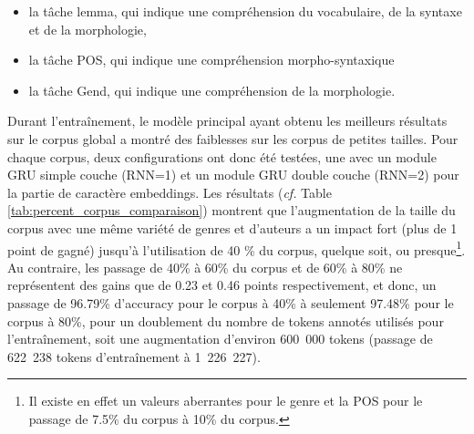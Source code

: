 \begin{itemize}
    \item la tâche lemma, qui indique une compréhension du vocabulaire, de la syntaxe et de la morphologie,
    \item la tâche POS, qui indique une compréhension morpho-syntaxique
    \item la tâche Gend, qui indique une compréhension de la morphologie.
\end{itemize}

Durant l'entraînement, le modèle principal ayant obtenu les meilleurs résultats sur le corpus global a montré des faiblesses sur les corpus de petites tailles. Pour chaque corpus, deux configurations ont donc été testées, une avec un module GRU simple couche (RNN=1) et un module GRU double couche (RNN=2) pour la partie de caractère embeddings. Les résultats (\textit{cf.} Table \ref{tab:percent_corpus_comparaison}) montrent que l'augmentation de la taille du corpus avec une même variété de genres et d'auteurs a un impact fort (plus de 1 point de gagné) jusqu'à l'utilisation de 40 \% du corpus, quelque soit, ou presque\footnote{Il existe en effet un valeurs aberrantes pour le genre et la POS pour le passage de 7.5\% du corpus à 10\% du corpus.}. Au contraire, les passage de 40\% à 60\% du corpus et de 60\% à 80\% ne représentent des gains que de 0.23 et 0.46 points respectivement, et donc, un passage de 96.79\% d'accuracy pour le corpus à 40\% à seulement 97.48\% pour le corpus à 80\%, pour un doublement du nombre de tokens annotés utilisés pour l'entraînement, soit une augmentation d'environ 600~000 tokens (passage de 622~238 tokens d'entraînement à 1~226~227).


